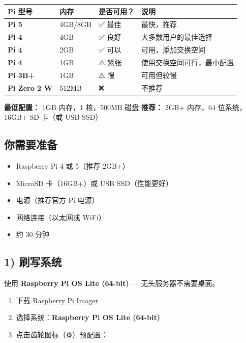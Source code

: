 \begin{table}[h]
\centering
\small
\begin{tabular}{|l|l|l|l|}
\hline
Pi 型号 & 内存 & 是否可用？ & 说明 \\
\hline
\textbf{Pi 5} & 4GB/8GB & ✅ 最佳 & 最快，推荐 \\
\hline
\textbf{Pi 4} & 4GB & ✅ 良好 & 大多数用户的最佳选择 \\
\hline
\textbf{Pi 4} & 2GB & ✅ 可以 & 可用，添加交换空间 \\
\hline
\textbf{Pi 4} & 1GB & ⚠️ 紧张 & 使用交换空间可行，最小配置 \\
\hline
\textbf{Pi 3B+} & 1GB & ⚠️ 慢 & 可用但较慢 \\
\hline
\textbf{Pi Zero 2 W} & 512MB & ❌ & 不推荐 \\
\hline
\end{tabular}
\end{table}



\textbf{最低配置：} 1GB 内存，1 核，500MB 磁盘
\textbf{推荐：} 2GB+ 内存，64 位系统，16GB+ SD 卡（或 USB SSD）

\subsection{你需要准备}


\begin{itemize}
  \item Raspberry Pi 4 或 5（推荐 2GB+）
  \item MicroSD 卡（16GB+）或 USB SSD（性能更好）
  \item 电源（推荐官方 Pi 电源）
  \item 网络连接（以太网或 WiFi）
  \item 约 30 分钟
\end{itemize}


\subsection{1) 刷写系统}


使用 \textbf{Raspberry Pi OS Lite (64-bit)} — 无头服务器不需要桌面。

\begin{enumerate}
  \item 下载 \href{https://www.raspberrypi.com/software/}{Raspberry Pi Imager}
  \item 选择系统：\textbf{Raspberry Pi OS Lite (64-bit)}
  \item 点击齿轮图标（⚙️）预配置：
\end{enumerate}

